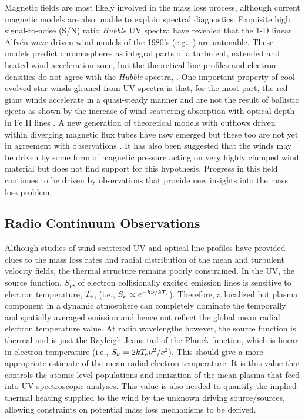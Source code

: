 \documentclass[iop]{emulateapj}
\begin{document}
Magnetic fields are most likely involved in the mass loss process, although current magnetic models are also unable to explain spectral diagnostics. Exquisite high signal-to-noise (S/N) ratio \textit{Hubble} UV spectra have revealed that the 1-D linear Alfv\'en wave-driven wind models of the 1980’s (e.g., \citealt{1980ApJ...242..260H,1988PhDT........13H}) are untenable. These models predict chromospheres as integral parts of a turbulent, extended and heated wind acceleration zone, but the theoretical line profiles and electron densities do not agree with the \textit{Hubble} spectra, \cite[e.g.,][]{1998ApJ...494..828J}. One important property of cool evolved star winds gleaned from UV spectra is that, for the most part, the red giant winds accelerate in a quasi-steady manner and are not the result of ballistic ejecta as shown by the increase of wind scattering absorption with optical depth in Fe II lines \citep{1999ApJ...521..382C}. A new generation of theoretical models with outflows driven within diverging magnetic flux tubes have now emerged \citep{2006MNRAS.368.1145F, 2007ApJ...659.1592S} but these too are not yet in agreement with observations \citep{2009AIPC.1094..267C}. It has also been suggested that the winds may be driven by some form of magnetic pressure acting on very highly clumped wind material \citep{2008AJ....136.1964E} but \cite{2010ApJ...720.1767H} does not find support for this hypothesis. Progress in this field continues to be driven by observations that provide new insights into the mass loss problem.

\subsection{Radio Continuum Observations} \label{intro1} 

Although studies of wind-scattered UV and optical line profiles have provided clues to the mass loss rates and radial distribution of the mean and turbulent velocity fields, the thermal structure remains poorly constrained. In the UV, the source function, $S_{\nu}$, of electron collisionally excited emission lines is sensitive to electron temperature, $T_{\rm{e}}$, (i.e., $S_{\nu} \propto e^{-h\nu /kT_{\rm{e}}}$). Therefore, a localized hot plasma component in a dynamic atmosphere can completely dominate the temporally and spatially averaged emission and hence not reflect the global mean radial electron temperature value. At radio wavelengths however, the source function is thermal and is just the Rayleigh-Jeans tail of the Planck function, which is linear in electron temperature (i.e., $S_{\nu} = {2kT_{\rm{e}}\nu ^2 /c^2}$). This should give a more appropriate estimate of the mean radial electron temperature. It is this value that controls the atomic level populations and ionization of the mean plasma that feed into UV spectroscopic analyses. This value is also needed to quantify the implied thermal heating supplied to the  wind by the unknown driving source/sources, allowing constraints on potential mass loss mechanisms to be derived.
\end{document}
